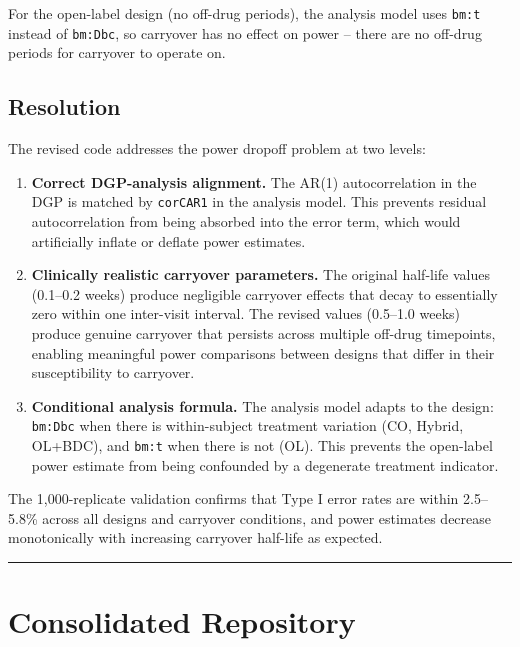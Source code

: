 \documentclass[11pt]{article}
\begin{document}
For the open-label design (no off-drug periods), the analysis
model uses \texttt{bm:t} instead of \texttt{bm:Dbc}, so carryover has no
effect on power -- there are no off-drug periods for carryover
to operate on.

\subsection{Resolution}

The revised code addresses the power dropoff problem at two
levels:

\begin{enumerate}
  \item \textbf{Correct DGP-analysis alignment.} The AR(1) autocorrelation
    in the DGP is matched by \texttt{corCAR1} in the analysis model.
    This prevents residual autocorrelation from being absorbed
    into the error term, which would artificially inflate or
    deflate power estimates.

  \item \textbf{Clinically realistic carryover parameters.} The original
    half-life values (0.1--0.2 weeks) produce negligible carryover
    effects that decay to essentially zero within one inter-visit
    interval. The revised values (0.5--1.0 weeks) produce genuine
    carryover that persists across multiple off-drug timepoints,
    enabling meaningful power comparisons between designs that
    differ in their susceptibility to carryover.

  \item \textbf{Conditional analysis formula.} The analysis model adapts
    to the design: \texttt{bm:Dbc} when there is within-subject treatment
    variation (CO, Hybrid, OL+BDC), and \texttt{bm:t} when there is not
    (OL). This prevents the open-label power estimate from being
    confounded by a degenerate treatment indicator.
\end{enumerate}

The 1,000-replicate validation confirms that Type I error rates
are within 2.5--5.8\% across all designs and carryover conditions,
and power estimates decrease monotonically with increasing
carryover half-life as expected.

\bigskip\noindent\rule{\textwidth}{0.4pt}\bigskip

\section{Consolidated Repository}
\end{document}
